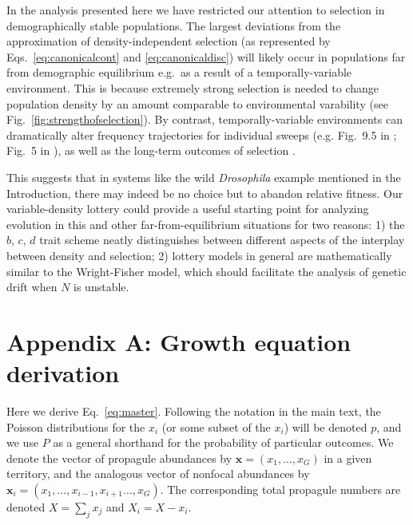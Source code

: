 \documentclass[12pt]{article}
\begin{document}
In the analysis presented here we have restricted our attention to selection in demographically stable populations. The largest deviations from the approximation of density-independent selection (as represented by Eqs.~\eqref{eq:canonicalcont} and \eqref{eq:canonicaldisc}) will likely occur in populations far from demographic equilibrium e.g.~as a result of a temporally-variable environment. This is because extremely strong selection is needed to change population density by an amount comparable to environmental varability (see Fig.~\ref{fig:strengthofselection}). By contrast, temporally-variable environments can dramatically alter frequency trajectories for individual sweeps (e.g. Fig.~9.5 in \cite{otto_2011}; Fig.~5 in \cite{mallet_2012}), as well as the long-term outcomes of selection \citep{lande_2009}. 

This suggests that in systems like the wild \textit{Drosophila} example mentioned in the Introduction, there may indeed be no choice but to abandon relative fitness. Our variable-density lottery could provide a useful starting point for analyzing evolution in this and other far-from-equilibrium situations for two reasons: 1) the $b$, $c$, $d$ trait scheme neatly distinguishes between different aspects of the interplay between density and selection; 2) lottery models in general are mathematically similar to the Wright-Fisher model, which should facilitate the analysis of genetic drift when $N$ is unstable.


 

\section*{Appendix A: Growth equation derivation}

Here we derive Eq.~\eqref{eq:master}. Following the notation in the main text, the Poisson distributions for the $x_i$ (or some subset of the $x_i$) will be denoted $p$, and we use $P$ as a general shorthand for the probability of particular outcomes. We denote the vector of propagule abundances by ${\mathbf x} = (x_1,\ldots,x_G)$ in a given territory, and the analogous vector of nonfocal abundances by ${\mathbf x_i}=(x_1,\ldots,x_{i-1},x_{i+1}\ldots,x_G)$. The corresponding total propagule numbers are denoted $X=\sum_j x_j$ and $X_i=X-x_i$.
\end{document}
